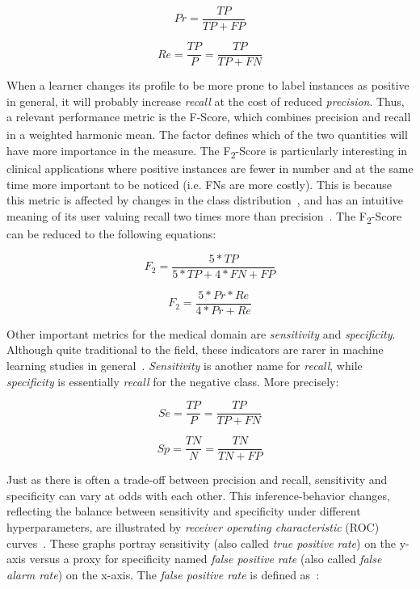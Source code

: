 \begin{equation}
    Pr = \frac{TP}{TP+FP}
\end{equation}

\begin{equation}
    Re = \frac{TP}{P} = \frac{TP}{TP+FN}
\end{equation}

When a learner changes its profile to be more prone to label instances as positive in general, it will probably increase \textit{recall} at the cost of reduced \textit{precision}.
Thus, a relevant performance metric is the F\textsubscript{\textbeta }-Score, which combines precision and recall in a weighted harmonic mean.
The \textbeta{} factor defines which of the two quantities will have more importance in the measure.
The F\textsubscript{2}-Score is particularly interesting in clinical applications where positive instances are fewer in number and at the same time more important to be noticed (i.e. FNs are more costly).
This is because this metric is affected by changes in the class distribution~\cite{Tharwat2018}, and has an intuitive meaning of its user valuing recall two times more than precision~\cite{C.J.vanRijsbergen1977}.
The F\textsubscript{2}-Score can be reduced to the following equations:

\begin{equation}
    F_2 = \frac{5*TP}{5*TP+4*FN+FP}
\end{equation}

\begin{equation}
    F_2 = \frac{5*Pr*Re}{4*Pr+Re}
\end{equation}

Other important metrics for the medical domain are \textit{sensitivity} and \textit{specificity}.
Although quite traditional to the field, these indicators are rarer in machine learning studies in general~\cite{Kubat2017}.
\textit{Sensitivity} is another name for \textit{recall}, while \textit{specificity} is essentially \textit{recall} for the negative class.
More precisely:

\begin{equation}
    Se = \frac{TP}{P} = \frac{TP}{TP+FN}
\end{equation}

\begin{equation}
    Sp = \frac{TN}{N} = \frac{TN}{TN+FP}
\end{equation}

Just as there is often a trade-off between precision and recall, sensitivity and specificity can vary at odds with each other.
This inference-behavior changes, reflecting the balance between sensitivity and specificity under different hyperparameters, are illustrated by \textit{receiver operating characteristic} (ROC) curves~\cite{Kubat2017}.
These graphs portray sensitivity (also called \textit{true positive rate}) on the y-axis versus a proxy for specificity named \textit{false positive rate} (also called \textit{false alarm rate}) on the x-axis.
The \textit{false positive rate} is defined as~\cite{Fawcett2006}:

